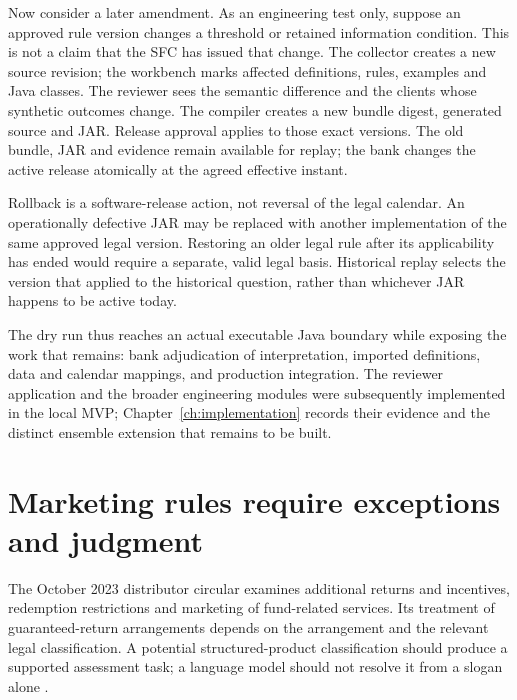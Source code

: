 
Now consider a later amendment. As an engineering test only, suppose an approved
rule version changes a threshold or retained information condition. This is not
a claim that the SFC has issued that change. The collector creates a new source
revision; the workbench marks affected definitions, rules, examples and Java
classes. The reviewer sees the semantic difference and the clients whose
synthetic outcomes change. The compiler creates a new bundle digest, generated
source and JAR. Release approval applies to those exact versions. The old
bundle, JAR and evidence remain available for replay; the bank changes the
active release atomically at the agreed effective instant.

Rollback is a software-release action, not reversal of the legal calendar.
An operationally defective JAR may be replaced with another implementation of
the same approved legal version. Restoring an older legal rule after its
applicability has ended would require a separate, valid legal basis. Historical
replay selects the version that applied to the historical question, rather
than whichever JAR happens to be active today.

The dry run thus reaches an actual executable Java boundary while exposing
the work that remains: bank adjudication of interpretation, imported definitions,
data and calendar mappings, and production integration. The reviewer application and the broader
engineering modules were subsequently implemented in the local MVP;
Chapter~\ref{ch:implementation} records their evidence and the distinct ensemble
extension that remains to be built.

\section{Marketing rules require exceptions and judgment}
\label{merge:P-01-problem:04}


The October 2023 distributor circular examines additional returns and incentives,
redemption restrictions and marketing of fund-related services. Its treatment of
guaranteed-return arrangements depends on the arrangement and the relevant legal
classification. A potential structured-product classification should produce a
supported assessment task; a language model should not resolve it from a slogan
alone \citep[paras.~5--11]{sfcmarketing}.

